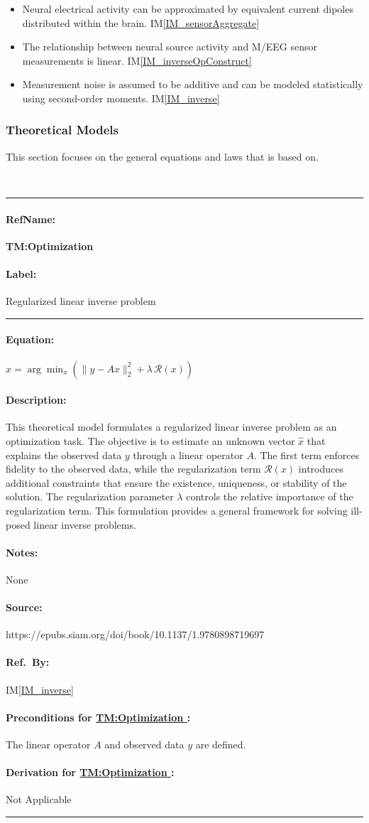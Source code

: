\documentclass[12pt]{article}
\newcounter{assumpnum} %
\newcommand{\iref}[1]{IM\ref{#1}}
\newcommand{\deftheory}[9][Not Applicable]
{
\newpage
\noindent \rule{\textwidth}{0.5mm}

\paragraph{RefName: } \textbf{#2} \phantomsection 
\label{#2}

\paragraph{Label:} #3

\noindent \rule{\textwidth}{0.5mm}

\paragraph{Equation:}

#4

\paragraph{Description:}

#5

\paragraph{Notes:}

#6

\paragraph{Source:}

#7

\paragraph{Ref.\ By:}

#8

\paragraph{Preconditions for \hyperref[#2]{#2}:}
\label{#2_precond}

#9

\paragraph{Derivation for \hyperref[#2]{#2}:}
\label{#2_deriv}

#1

\noindent \rule{\textwidth}{0.5mm}

}
\begin{document}
\begin{itemize}

    \item[A\refstepcounter{assumpnum}\theassumpnum \label{A_dipole}:]
    Neural electrical activity can be approximated by equivalent current dipoles distributed within the brain. \iref{IM_sensorAggregate}

    \item[A\refstepcounter{assumpnum}\theassumpnum \label{A_linear}:]
    The relationship between neural source activity and M/EEG sensor measurements is linear. \iref{IM_inverseOpConstruct}

    \item[A\refstepcounter{assumpnum}\theassumpnum \label{A_noiseGaussian}:]
    Measurement noise is assumed to be additive and can be modeled statistically using second-order moments. \iref{IM_inverse}

\end{itemize}




\subsubsection{Theoretical Models}\label{sec_theoretical}


This section focuses on the general equations and laws that \progname{} is based on.


~\newline
\noindent
\label{TM:Optimization}
\deftheory
{ TM:Optimization }
{ Regularized linear inverse problem }
{
    $\hat{x} =
    \arg\min_{x}
    \left(
        \|y - Ax\|_2^2
        + \lambda\,\mathcal{R}(x)
    \right)$
}
{
    This theoretical model formulates a regularized linear inverse problem as an optimization task. The objective is to estimate an unknown vector $\hat{x}$ that explains the observed data $y$ through a linear operator $A$. The first term enforces fidelity to the observed data, while the regularization term $\mathcal{R}(x)$ introduces additional constraints that ensure the existence, uniqueness, or stability of the solution. The regularization parameter $\lambda$ controls the relative importance of the regularization term. This formulation provides a general framework for solving ill-posed linear inverse problems.
}
{ None }
{ https://epubs.siam.org/doi/book/10.1137/1.9780898719697 }
{ \iref{IM_inverse} }
{ The linear operator $A$ and observed data $y$ are defined. }
~\newline
\end{document}
